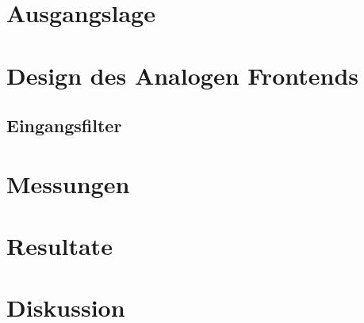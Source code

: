 \documentclass{fhnwreport} %
\begin{document}
\clearpage

\section{Ausgangslage}
\label{sec:ausgangslage}


\clearpage

\section{Design des Analogen Frontends}
\label{sec:afe}

\subsection{Eingangsfilter}
\label{sec:filter}


\clearpage

\section{Messungen}
\label{sec:messungen}


\clearpage

\section{Resultate}
\label{sec:resultate}


\clearpage

\section{Diskussion}
\label{sec:diskussion}

\end{document}
